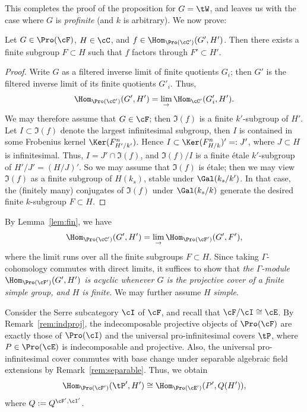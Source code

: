 This completes the proof of the proposition for $G = \tW$, and leaves us with the case where $G$ is \emph{profinite} (and $k$ is arbitrary). We now prove:


\begin{lemm}\label{lem:fin}
Let $G \in \Pro(\cF)$, $H \in \cC$, and $f \in \Hom_{\Pro(\cC')}(G',H')$. Then there exists a finite subgroup $F \subset H$ such that $f$ factors through $F' \subset H'$.
\end{lemm}


\begin{proof}
Write $G$ as a filtered inverse limit of finite quotients $G_i$; then $G'$ is the filtered inverse limit of its finite quotients $G'_i$. Thus,
\[
\Hom_{\Pro(\cC')}(G',H') =
\lim_{\to} \Hom_{\cC'}(G'_i,H').
\]
We may therefore assume that $G \in \cF$; then $\Im(f)$ is a finite $k'$-subgroup of $H'$. Let $I \subset \Im(f)$ denote the largest infinitesimal subgroup, then $I$ is contained in some Frobenius kernel $\Ker(F^n_{H'/k'})$. Hence $I \subset \Ker(F^n_{H/k})' =: J'$, where $J \subset H$ is infinitesimal. Thus, $I = J' \cap \Im(f)$, and $\Im(f)/I$ is a finite \'etale $k'$-subgroup of $H'/J' = (H/J)'$. So we may assume that $\Im(f)$ is \'etale; then we may view $\Im(f)$ as a finite subgroup of $H(k_s)$, stable under $\Gal(k_s/k')$. In that case, the (finitely many) conjugates of $\Im(f)$ under $\Gal(k_s/k)$ generate the desired finite $k$-subgroup $F \subset H$.
\end{proof}

By Lemma~\ref{lem:fin}, we have
\[
\Hom_{\Pro(\cC')}(G',H') =
\lim_{\to} \Hom_{\Pro(\cF')}(G',F'),
\]
where the limit runs over all the finite subgroups $F \subset H$. Since taking $\Gamma$-cohomology commutes with direct limits, it suffices to show that
\emph{the $\Gamma$-module $\Hom_{\Pro(\cF')}(G',H')$ is acyclic whenever $G$ is the projective cover of a finite simple group, and $H$ is finite}. We may further assume $H$ \emph{simple}.

Consider the Serre subcategory $\cI$ of $\cF$, and recall that $\cF/\cI \cong \cE$. By Remark~\ref{rem:indproj}, the indecomposable projective objects of $\Pro(\cF)$ are exactly those of $\Pro(\cI)$ and the universal pro-infinitesimal covers $\tP$, where $P \in \Pro(\cE)$ is indecomposable and projective. Also, the universal pro-infinitesimal cover commutes with base change under separable algebraic field extensions by Remark~\ref{rem:separable}. Thus, we obtain
\[
\Hom_{\Pro(\cF')}(\tP', H') \cong
\Hom_{\Pro(\cE')}(P', Q(H')),
\]
where $Q := Q^{\cF', \cI'}$.

